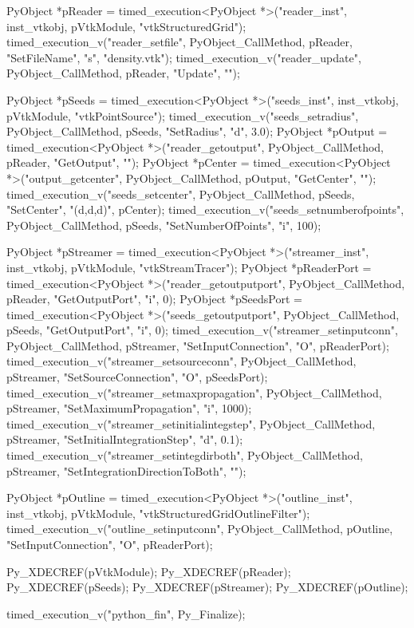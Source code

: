 \begin{appendices}
\begin{cpp}[label=lst:cpp-native-vtk,caption={Native C++ VTK benchmark source code.},aboveskip=20pt]
{	PyObject *pReader = timed_execution<PyObject *>("reader_inst", inst_vtkobj, pVtkModule, "vtkStructuredGrid");
	timed_execution_v("reader_setfile", PyObject_CallMethod, pReader, "SetFileName", "s", "density.vtk");
	timed_execution_v("reader_update", PyObject_CallMethod, pReader, "Update", "");

	PyObject *pSeeds = timed_execution<PyObject *>("seeds_inst", inst_vtkobj, pVtkModule, "vtkPointSource");
	timed_execution_v("seeds_setradius", PyObject_CallMethod, pSeeds, "SetRadius", "d", 3.0);
	PyObject *pOutput = timed_execution<PyObject *>("reader_getoutput", PyObject_CallMethod, pReader, "GetOutput", "");
	PyObject *pCenter = timed_execution<PyObject *>("output_getcenter", PyObject_CallMethod, pOutput, "GetCenter", "");
	timed_execution_v("seeds_setcenter", PyObject_CallMethod, pSeeds, "SetCenter", "(d,d,d)", pCenter);
	timed_execution_v("seeds_setnumberofpoints", PyObject_CallMethod, pSeeds, "SetNumberOfPoints", "i", 100);

	PyObject *pStreamer = timed_execution<PyObject *>("streamer_inst", inst_vtkobj, pVtkModule, "vtkStreamTracer");
	PyObject *pReaderPort = timed_execution<PyObject *>("reader_getoutputport", PyObject_CallMethod, pReader, "GetOutputPort", "i", 0);
	PyObject *pSeedsPort = timed_execution<PyObject *>("seeds_getoutputport", PyObject_CallMethod, pSeeds, "GetOutputPort", "i", 0);
	timed_execution_v("streamer_setinputconn", PyObject_CallMethod, pStreamer, "SetInputConnection", "O", pReaderPort);
	timed_execution_v("streamer_setsourceconn", PyObject_CallMethod, pStreamer, "SetSourceConnection", "O", pSeedsPort);
	timed_execution_v("streamer_setmaxpropagation", PyObject_CallMethod, pStreamer, "SetMaximumPropagation", "i", 1000);
	timed_execution_v("streamer_setinitialintegstep", PyObject_CallMethod, pStreamer, "SetInitialIntegrationStep", "d", 0.1);
	timed_execution_v("streamer_setintegdirboth", PyObject_CallMethod, pStreamer, "SetIntegrationDirectionToBoth", "");

	PyObject *pOutline = timed_execution<PyObject *>("outline_inst", inst_vtkobj, pVtkModule, "vtkStructuredGridOutlineFilter");
	timed_execution_v("outline_setinputconn", PyObject_CallMethod, pOutline, "SetInputConnection", "O", pReaderPort);

	Py_XDECREF(pVtkModule);
	Py_XDECREF(pReader);
	Py_XDECREF(pSeeds);
	Py_XDECREF(pStreamer);
	Py_XDECREF(pOutline);

	timed_execution_v("python_fin", Py_Finalize);
}
\end{cpp}


\end{appendices}
